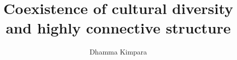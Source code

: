 \documentclass{article}
\theoremstyle{definition}
\begin{document}
\title{Coexistence of cultural diversity and highly connective structure}
 \author{Dhamma Kimpara}

\maketitle



















\newpage




\newpage

\appendix


\end{document}
